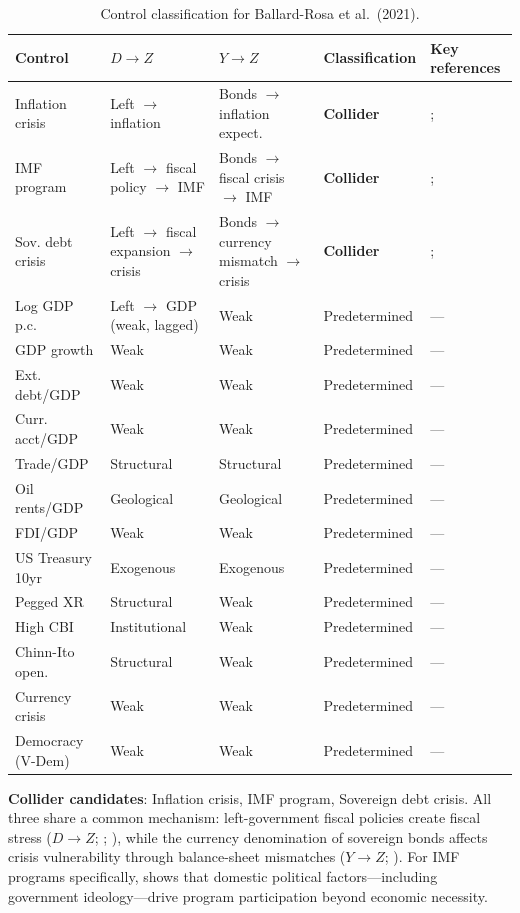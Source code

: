 \documentclass[
]{article}
\begin{document}
\begin{table}[H]
\centering
\small
\caption{Control classification for Ballard-Rosa et al.\ (2021).}
\begin{tabular}{llllp{3cm}}
\toprule
Control & $D \to Z$ & $Y \to Z$ & Classification & Key references \\
\midrule
Inflation crisis & Left $\to$ inflation & Bonds $\to$ inflation expect. & \textbf{Collider} & \citet{hibbs1977}; \citet{alesina1987} \\
IMF program & Left $\to$ fiscal policy $\to$ IMF & Bonds $\to$ fiscal crisis $\to$ IMF & \textbf{Collider} & \citet{vreeland2003}; \citet{eichengreen2005} \\
Sov. debt crisis & Left $\to$ fiscal expansion $\to$ crisis & Bonds $\to$ currency mismatch $\to$ crisis & \textbf{Collider} & \citet{alesina_tabellini1990}; \citet{eichengreen2005} \\
Log GDP p.c. & Left $\to$ GDP (weak, lagged) & Weak & Predetermined & --- \\
GDP growth & Weak & Weak & Predetermined & --- \\
Ext. debt/GDP & Weak & Weak & Predetermined & --- \\
Curr. acct/GDP & Weak & Weak & Predetermined & --- \\
Trade/GDP & Structural & Structural & Predetermined & --- \\
Oil rents/GDP & Geological & Geological & Predetermined & --- \\
FDI/GDP & Weak & Weak & Predetermined & --- \\
US Treasury 10yr & Exogenous & Exogenous & Predetermined & --- \\
Pegged XR & Structural & Weak & Predetermined & --- \\
High CBI & Institutional & Weak & Predetermined & --- \\
Chinn-Ito open. & Structural & Weak & Predetermined & --- \\
Currency crisis & Weak & Weak & Predetermined & --- \\
Democracy (V-Dem) & Weak & Weak & Predetermined & --- \\
\bottomrule
\end{tabular}
\end{table}

\textbf{Collider candidates}: Inflation crisis, IMF program, Sovereign
debt crisis. All three share a common mechanism: left-government fiscal
policies create fiscal stress (\(D \to Z\);
\citealt{alesina_tabellini1990}; \citealt{alesina1987}), while the
currency denomination of sovereign bonds affects crisis vulnerability
through balance-sheet mismatches (\(Y \to Z\);
\citealt{eichengreen2005}). For IMF programs specifically,
\citet{vreeland2003} shows that domestic political factors---including
government ideology---drive program participation beyond economic
necessity.
\end{document}
